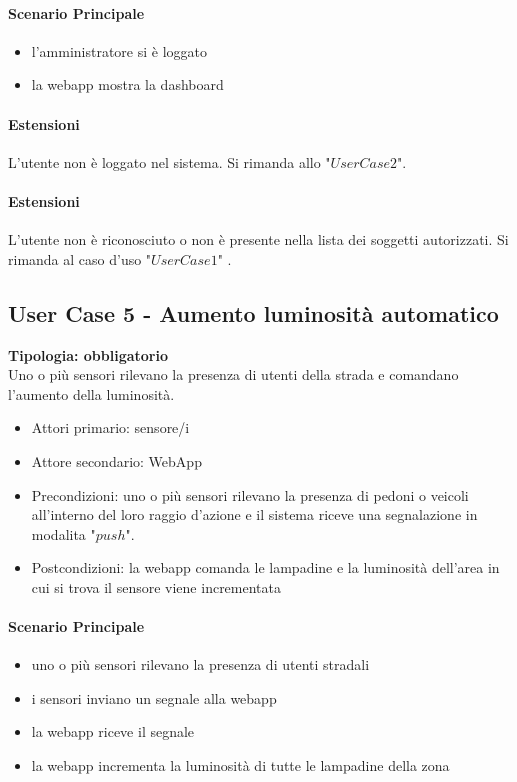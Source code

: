 \documentclass[12pt]{article}
\begin{document}
\paragraph{Scenario Principale}
\begin{itemize}
	\item l'amministratore si è loggato
	\item la webapp mostra la dashboard
\end{itemize}

\paragraph{Estensioni} L'utente non è loggato nel sistema. Si rimanda allo "$User Case 2$".
\paragraph{Estensioni} L'utente non è riconosciuto o non è presente nella lista dei soggetti autorizzati. Si rimanda al caso d'uso "$User Case 1$" .

\subsection{User Case 5 - Aumento luminosità automatico}
\textbf{Tipologia: obbligatorio}\\
Uno o più sensori rilevano la presenza di utenti della strada e comandano l'aumento della luminosità.
\begin{itemize}
	\item Attori primario: sensore/i
	\item Attore secondario: WebApp
	\item Precondizioni: uno o più sensori rilevano la presenza di pedoni o veicoli all'interno del loro raggio d'azione e il sistema riceve una segnalazione in modalita "$push$".
	\item Postcondizioni: la webapp comanda le lampadine e la luminosità dell'area in cui si trova il sensore viene incrementata
\end{itemize}
\paragraph{Scenario Principale}
\begin{itemize}
	\item uno o più sensori rilevano la presenza di utenti stradali
	\item i sensori inviano un segnale alla webapp
	\item la webapp riceve il segnale
	\item la webapp incrementa la luminosità di tutte le lampadine della zona
\end{itemize}
\end{document}
